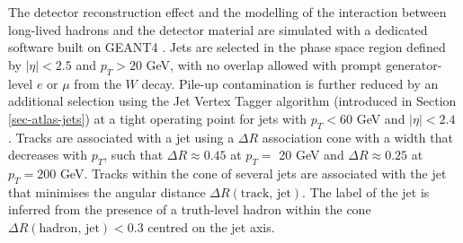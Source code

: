 The detector reconstruction effect and the modelling of the interaction between long-lived hadrons and the detector material are simulated with a dedicated software \cite{ATLASSimulationInfra} built on GEANT4 \cite{Agostinelli:602040}. Jets are selected in the phase space region defined by $|\eta| < 2.5$ and $p_T > 20$ GeV, with no overlap allowed with prompt generator-level $e$ or $\mu$ from the $W$ decay. Pile-up contamination is further reduced by an additional selection using the Jet Vertex Tagger algorithm (introduced in Section \ref{sec-atlas-jets}) at a tight operating point for jets with $p_T < 60$ GeV and $|\eta| < 2.4$ \cite{ATLAS-CONF-2014-018}. Tracks are associated with a jet using a $\Delta R$ association cone with a width that decreases with $p_T$, such that $\Delta R \approx 0.45$ at $p_T =$ 20 GeV and $\Delta R \approx 0.25$ at $p_T = 200$ GeV. Tracks within the cone of several jets are associated with the jet that minimises the angular distance $\Delta R(\textrm{track, jet})$. The label of the jet is inferred from the presence of a truth-level hadron within the cone $\Delta R(\textrm{hadron, jet}) < 0.3$ centred on the jet axis.

